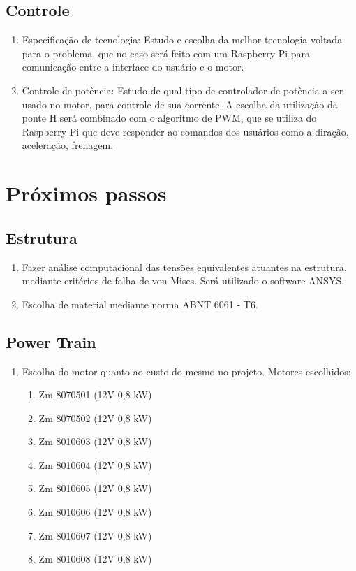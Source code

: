   \subsection{Controle}
    \begin{enumerate}
      \item Especificação de tecnologia: Estudo e escolha da melhor tecnologia voltada para o problema, que no caso será feito com um Raspberry Pi para comunicação entre a interface do usuário e o motor.

      \item Controle de potência: Estudo de qual tipo de controlador de potência a ser usado no motor, para controle de sua corrente. A escolha da utilização da ponte H será combinado com o algoritmo de PWM, que se utiliza do Raspberry Pi que deve responder ao comandos dos usuários como a diração, aceleração, frenagem.

    \end{enumerate}

\section{Próximos passos}
  \subsection{Estrutura}
    \begin{enumerate}
      \item Fazer análise computacional das tensões equivalentes atuantes na estrutura, mediante critérios de falha de von Mises. Será utilizado o software ANSYS.
      \item Escolha de material mediante norma ABNT 6061 - T6.
    \end{enumerate}
  \subsection{Power Train}
    \begin{enumerate}
      \item Escolha do motor quanto ao custo do mesmo no projeto. Motores escolhidos:
      \begin{enumerate}
        \item Zm 8070501 (12V 0,8 kW)
        \item Zm 8070502 (12V 0,8 kW)
        \item Zm 8010603 (12V 0,8 kW)
        \item Zm 8010604 (12V 0,8 kW)
        \item Zm 8010605 (12V 0,8 kW)
        \item Zm 8010606 (12V 0,8 kW)
        \item Zm 8010607 (12V 0,8 kW)
        \item Zm 8010608 (12V 0,8 kW)
      \end{enumerate}
    \end{enumerate}
